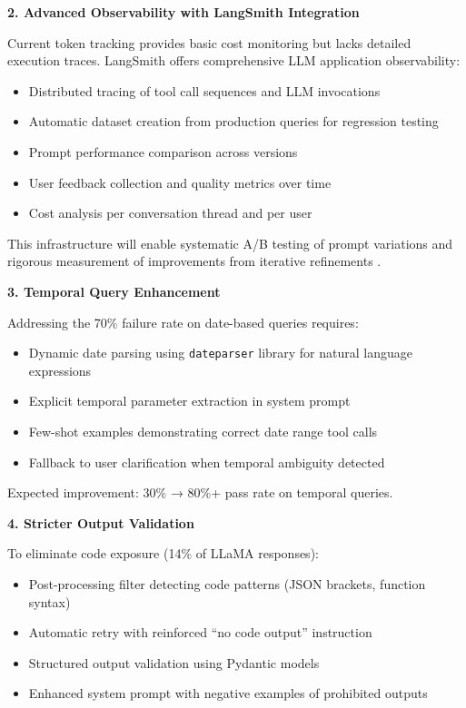 \documentclass{article}
\begin{document}
\textbf{2. Advanced Observability with LangSmith Integration}

Current token tracking provides basic cost monitoring but lacks detailed execution traces. LangSmith \cite{langchain2024langsmith} offers comprehensive LLM application observability:

\begin{itemize}
    \item Distributed tracing of tool call sequences and LLM invocations
    \item Automatic dataset creation from production queries for regression testing
    \item Prompt performance comparison across versions
    \item User feedback collection and quality metrics over time
    \item Cost analysis per conversation thread and per user
\end{itemize}

This infrastructure will enable systematic A/B testing of prompt variations and rigorous measurement of improvements from iterative refinements \cite{prompt2024engineering}.

\textbf{3. Temporal Query Enhancement}

Addressing the 70\% failure rate on date-based queries requires:

\begin{itemize}
    \item Dynamic date parsing using \texttt{dateparser} library for natural language expressions
    \item Explicit temporal parameter extraction in system prompt
    \item Few-shot examples demonstrating correct date range tool calls
    \item Fallback to user clarification when temporal ambiguity detected
\end{itemize}

Expected improvement: 30\% → 80\%+ pass rate on temporal queries.

\textbf{4. Stricter Output Validation}

To eliminate code exposure (14\% of LLaMA responses):

\begin{itemize}
    \item Post-processing filter detecting code patterns (JSON brackets, function syntax)
    \item Automatic retry with reinforced ``no code output'' instruction
    \item Structured output validation using Pydantic models
    \item Enhanced system prompt with negative examples of prohibited outputs
\end{itemize}
\end{document}
